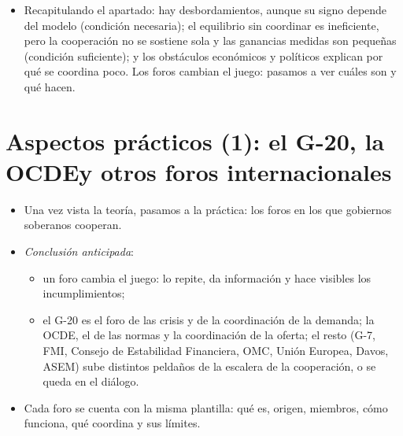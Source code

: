 \documentclass[11pt]{article}
\begin{document}
\begin{infografia}[H]
\centering
\caption{La escalera de la cooperación internacional y sus foros}\label{figu:escalera}
\end{infografia}


\begin{itemize}
\item Recapitulando el apartado: hay desbordamientos, aunque su signo depende del modelo (condición necesaria); el equilibrio sin coordinar es ineficiente, pero la cooperación no se sostiene sola y las ganancias medidas son pequeñas (condición suficiente); y los obstáculos económicos y políticos explican por qué se coordina poco. Los foros cambian el juego: pasamos a ver cuáles son y qué hacen.
\end{itemize}

\section{Aspectos prácticos (1): el G-20, la OCDE\cortetitulo y otros foros internacionales}\label{sec:foros}

\begin{itemize}
\item Una vez vista la teoría, pasamos a la práctica: los foros en los que gobiernos soberanos cooperan.
\item \emph{Conclusión anticipada}:
  \begin{itemize}
  \item un foro cambia el juego: lo repite, da información y hace visibles los incumplimientos;
  \item el G-20 es el foro de las crisis y de la coordinación de la demanda; la OCDE, el de las normas y la coordinación de la oferta; el resto (G-7, FMI, Consejo de Estabilidad Financiera, OMC, Unión Europea, Davos, ASEM) sube distintos peldaños de la escalera de la cooperación, o se queda en el diálogo.
  \end{itemize}
\item Cada foro se cuenta con la misma plantilla: qué es, origen, miembros, cómo funciona, qué coordina y sus límites.
\end{itemize}

\end{document}
